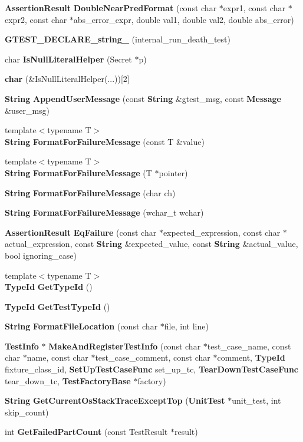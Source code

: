 \begin{CompactItemize}
\item 
{\bf AssertionResult} {\bf DoubleNearPredFormat} (const char $\ast$expr1, const char $\ast$expr2, const char $\ast$abs\_\-error\_\-expr, double val1, double val2, double abs\_\-error)
\item 
{\bf GTEST\_\-DECLARE\_\-string\_\-} (internal\_\-run\_\-death\_\-test)
\item 
char {\bf IsNullLiteralHelper} (Secret $\ast$p)
\item 
{\bf char} (\&IsNullLiteralHelper(...))[2]
\item 
{\bf String} {\bf AppendUserMessage} (const {\bf String} \&gtest\_\-msg, const {\bf Message} \&user\_\-msg)
\item 
{\footnotesize template$<$typename T$>$ }\\{\bf String} {\bf FormatForFailureMessage} (const T \&value)
\item 
{\footnotesize template$<$typename T$>$ }\\{\bf String} {\bf FormatForFailureMessage} (T $\ast$pointer)
\item 
{\bf String} {\bf FormatForFailureMessage} (char ch)
\item 
{\bf String} {\bf FormatForFailureMessage} (wchar\_\-t wchar)
\item 
{\bf AssertionResult} {\bf EqFailure} (const char $\ast$expected\_\-expression, const char $\ast$actual\_\-expression, const {\bf String} \&expected\_\-value, const {\bf String} \&actual\_\-value, bool ignoring\_\-case)
\item 
{\footnotesize template$<$typename T$>$ }\\{\bf TypeId} {\bf GetTypeId} ()
\item 
{\bf TypeId} {\bf GetTestTypeId} ()
\item 
{\bf String} {\bf FormatFileLocation} (const char $\ast$file, int line)
\item 
{\bf TestInfo} $\ast$ {\bf MakeAndRegisterTestInfo} (const char $\ast$test\_\-case\_\-name, const char $\ast$name, const char $\ast$test\_\-case\_\-comment, const char $\ast$comment, {\bf TypeId} fixture\_\-class\_\-id, {\bf SetUpTestCaseFunc} set\_\-up\_\-tc, {\bf TearDownTestCaseFunc} tear\_\-down\_\-tc, {\bf TestFactoryBase} $\ast$factory)
\item 
{\bf String} {\bf GetCurrentOsStackTraceExceptTop} ({\bf UnitTest} $\ast$unit\_\-test, int skip\_\-count)
\item 
int {\bf GetFailedPartCount} (const TestResult $\ast$result)
\item 

\end{CompactItemize}
